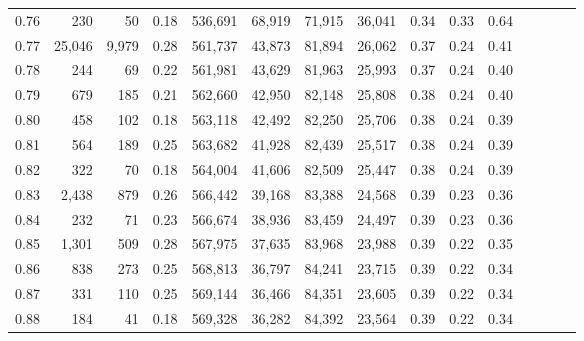 \begin{tabular}{rrrcrrrrrrrrrrr}
0.76 &     230 &      50 &                                       0.18 &  536,691 &   68,919 &   71,915 &   36,041 &  0.34 &  0.33 &                         0.64 \\
0.77 &  25,046 &   9,979 &                                       0.28 &  561,737 &   43,873 &   81,894 &   26,062 &  0.37 &  0.24 &                         0.41 \\
0.78 &     244 &      69 &                                       0.22 &  561,981 &   43,629 &   81,963 &   25,993 &  0.37 &  0.24 &                         0.40 \\
0.79 &     679 &     185 &                                       0.21 &  562,660 &   42,950 &   82,148 &   25,808 &  0.38 &  0.24 &                         0.40 \\
0.80 &     458 &     102 &                                       0.18 &  563,118 &   42,492 &   82,250 &   25,706 &  0.38 &  0.24 &                         0.39 \\
0.81 &     564 &     189 &                                       0.25 &  563,682 &   41,928 &   82,439 &   25,517 &  0.38 &  0.24 &                         0.39 \\
0.82 &     322 &      70 &                                       0.18 &  564,004 &   41,606 &   82,509 &   25,447 &  0.38 &  0.24 &                         0.39 \\
0.83 &   2,438 &     879 &                                       0.26 &  566,442 &   39,168 &   83,388 &   24,568 &  0.39 &  0.23 &                         0.36 \\
0.84 &     232 &      71 &                                       0.23 &  566,674 &   38,936 &   83,459 &   24,497 &  0.39 &  0.23 &                         0.36 \\
0.85 &   1,301 &     509 &                                       0.28 &  567,975 &   37,635 &   83,968 &   23,988 &  0.39 &  0.22 &                         0.35 \\
0.86 &     838 &     273 &                                       0.25 &  568,813 &   36,797 &   84,241 &   23,715 &  0.39 &  0.22 &                         0.34 \\
0.87 &     331 &     110 &                                       0.25 &  569,144 &   36,466 &   84,351 &   23,605 &  0.39 &  0.22 &                         0.34 \\
0.88 &     184 &      41 &                                       0.18 &  569,328 &   36,282 &   84,392 &   23,564 &  0.39 &  0.22 &                         0.34 \\

\end{tabular}
